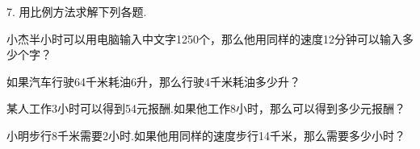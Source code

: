 7.	用比例方法求解下列各题. 

\begin{subquestions}

    \subquestion 小杰半小时可以用电脑输入中文字1250个，那么他用同样的速度12分钟可以输入多少个字？

    \subquestion 如果汽车行驶64千米耗油6升，那么行驶4千米耗油多少升？

    \subquestion 某人工作3小时可以得到54元报酬.如果他工作8小时，那么可以得到多少元报酬？

    \subquestion 小明步行8千米需要2小时.如果他用同样的速度步行14千米，那么需要多少小时？     

\end{subquestions}



